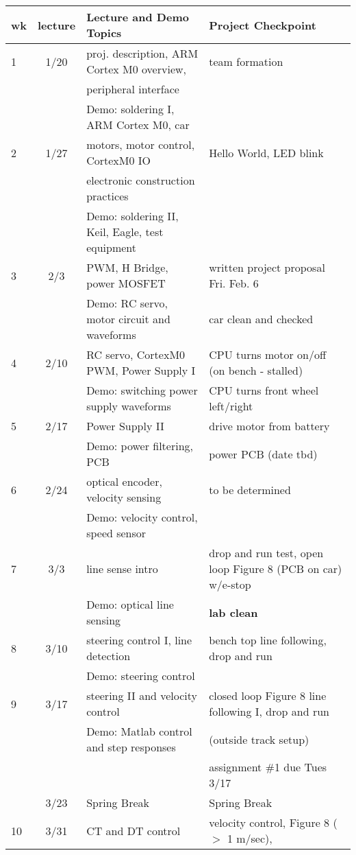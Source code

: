 \documentclass[10pt]{article}
\begin{document}
\footnotesize
\begin{tabular}{l| c|l|l}
\hline
wk & lecture & Lecture and Demo Topics & Project Checkpoint\\
\hline
1& 1/20 & proj. description, ARM Cortex M0 overview, & team formation\\
&  & peripheral interface \\
&  & Demo: soldering I, ARM Cortex M0, car \\
\hline
2& 1/27 & motors, motor control, CortexM0 IO & Hello World, LED blink\\
 & & electronic construction practices & \\
 &  & Demo: soldering II, Keil, Eagle, test equipment \\
\hline
3& 2/3 & PWM, H Bridge, power MOSFET & written project proposal Fri. Feb. 6\\
 & & Demo: RC servo, motor circuit and waveforms & car clean and checked\\
\hline
4 & 2/10 & RC servo, CortexM0 PWM, Power Supply I & CPU turns motor on/off 
(on bench - stalled)\\
 & & Demo: switching power supply waveforms 
               & CPU turns front wheel left/right\\
\hline
5& 2/17  & Power Supply II  & drive motor from battery\\
&  & Demo: power filtering, PCB & power PCB (date tbd) \\ 
\hline
6& 2/24  & optical encoder, velocity sensing & to be determined \\
&  & Demo: velocity control, speed sensor &  \\
\hline
7&3/3 & line sense intro & drop and run test, open loop Figure 8 (PCB on car) w/e-stop\\
& & Demo: optical line sensing & {\bf lab clean}\\
\hline
8&3/10 & steering control I, line detection & bench top line following, drop and run\\
& & Demo: steering control\\
\hline
9&3/17 & steering II and velocity control  & closed loop Figure 8 line following I, drop and run\\
& & Demo: Matlab control and step responses & (outside track setup) \\
& & & assignment \#1 due Tues 3/17\\
 \hline
 & 3/23 & Spring Break & Spring Break\\
\hline
10 & 3/31 & CT and DT control & velocity control, Figure 8 ($>$ 1 m/sec), 

\end{tabular}
\end{document}
